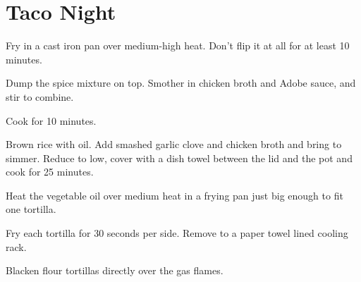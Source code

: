 
\section{Taco Night}
\begin{recipe}



Fry in a cast iron pan over medium-high heat. Don't flip it at all for at least 10 minutes.


Dump the spice mixture on top. Smother in chicken broth and Adobe sauce, and stir to combine.

Cook for 10 minutes.


Brown rice with oil. Add smashed garlic clove and chicken broth and bring to simmer.
Reduce to low, cover with a dish towel between the lid and the pot and
cook for 25 minutes.


Heat the vegetable oil over medium heat in a frying pan just big enough to fit one tortilla.

Fry each tortilla for 30 seconds per side. Remove to a paper towel lined cooling rack.

Blacken flour tortillas directly over the gas flames.


\end{recipe}
